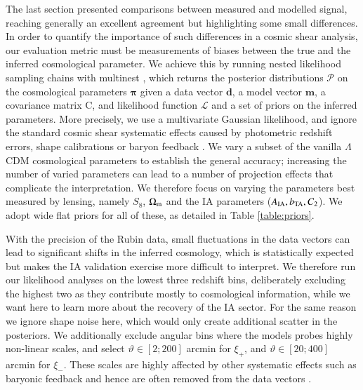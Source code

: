  
 The last section presented comparisons between measured and modelled signal, reaching generally an excellent agreement but highlighting some small differences. In order to quantify the importance of such differences in a cosmic shear analysis, our evaluation metric must be measurements of biases between the true and the inferred cosmological parameter. We achieve this by running nested likelihood sampling chains with {\sc multinest} \citep{Multinest}, which returns the posterior distributions $\mathcal{P}$ on the cosmological parameters $\boldsymbol \pi$ given a data vector $\boldsymbol  d$, a model vector $\boldsymbol m$, a covariance matrix C, and likelihood function $\mathcal L$ and a set of priors on the inferred parameters.  More precisely, we use a multivariate Gaussian likelihood, and ignore the standard cosmic shear systematic effects caused by photometric redshift errors, shape calibrations or baryon feedback \citep[see][for a recent example]{DESY3-KiDS1000}. We vary a subset of the vanilla $\Lambda$CDM cosmological parameters to establish the general accuracy; increasing the number of varied parameters can lead to a number of projection effects that complicate the interpretation. We therefore focus on varying the parameters best measured by lensing, namely $S_8$, $\Omega_{\rm m}$ and the IA parameters ($A_{\rm IA}, b_{\rm TA}, C_2$). We adopt wide flat priors for all of these, as detailed in Table \ref{table:priors}. 

With the precision of the Rubin data, small fluctuations in the data vectors can lead to significant shifts in the inferred cosmology, which is statistically  expected but makes the IA validation exercise more difficult to interpret. We therefore run our likelihood analyses on  the lowest three redshift bins, deliberately excluding the highest two as they contribute mostly to cosmological information, while we want here to learn more about the recovery of the IA sector. For the same reason we ignore shape noise here, which would only create additional scatter in the posteriors. We additionally exclude angular bins where the models probes highly non-linear scales, and select $\vartheta \in [2 ; 200]$ arcmin for $\xi_+$, and $\vartheta \in [20 ; 400]$ arcmin for $\xi_-$. These scales are highly affected by other systematic effects such as baryonic feedback \citep[see, e.g.][]{Semboloni11, HWVH15, 2020arXiv200715026H} and hence are often removed from the data vectors \citep[as in][]{DESY3_Amon}.


